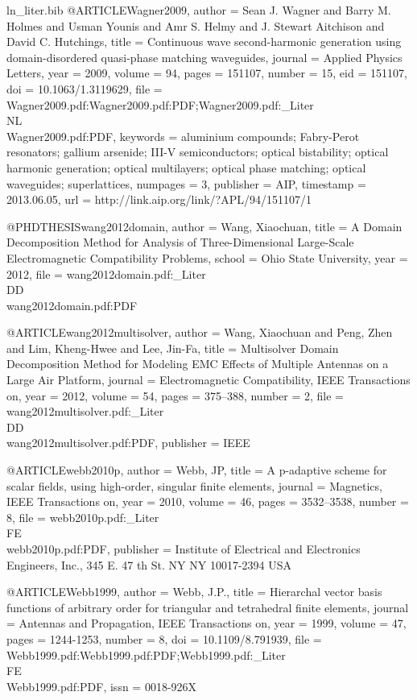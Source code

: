 \begin{filecontents*}{ln_liter.bib}
@ARTICLE{Wagner2009,
  author = {Sean J. Wagner and Barry M. Holmes and Usman Younis and Amr S. Helmy
	and J. Stewart Aitchison and David C. Hutchings},
  title = {Continuous wave second-harmonic generation using domain-disordered
	quasi-phase matching waveguides},
  journal = {Applied Physics Letters},
  year = {2009},
  volume = {94},
  pages = {151107},
  number = {15},
  eid = {151107},
  doi = {10.1063/1.3119629},
  file = {Wagner2009.pdf:Wagner2009.pdf:PDF;Wagner2009.pdf:_Liter\\NL\\Wagner2009.pdf:PDF},
  keywords = {aluminium compounds; Fabry-Perot resonators; gallium arsenide; III-V
	semiconductors; optical bistability; optical harmonic generation;
	optical multilayers; optical phase matching; optical waveguides;
	superlattices},
  numpages = {3},
  publisher = {AIP},
  timestamp = {2013.06.05},
  url = {http://link.aip.org/link/?APL/94/151107/1}
}

@PHDTHESIS{wang2012domain,
  author = {Wang, Xiaochuan},
  title = {A Domain Decomposition Method for Analysis of Three-Dimensional Large-Scale
	Electromagnetic Compatibility Problems},
  school = {Ohio State University},
  year = {2012},
  file = {wang2012domain.pdf:_Liter\\DD\\wang2012domain.pdf:PDF}
}

@ARTICLE{wang2012multisolver,
  author = {Wang, Xiaochuan and Peng, Zhen and Lim, Kheng-Hwee and Lee, Jin-Fa},
  title = {Multisolver Domain Decomposition Method for Modeling EMC Effects
	of Multiple Antennas on a Large Air Platform},
  journal = {Electromagnetic Compatibility, IEEE Transactions on},
  year = {2012},
  volume = {54},
  pages = {375--388},
  number = {2},
  file = {wang2012multisolver.pdf:_Liter\\DD\\wang2012multisolver.pdf:PDF},
  publisher = {IEEE}
}

@ARTICLE{webb2010p,
  author = {Webb, JP},
  title = {A p-adaptive scheme for scalar fields, using high-order, singular
	finite elements},
  journal = {Magnetics, IEEE Transactions on},
  year = {2010},
  volume = {46},
  pages = {3532--3538},
  number = {8},
  file = {webb2010p.pdf:_Liter\\FE\\webb2010p.pdf:PDF},
  publisher = {Institute of Electrical and Electronics Engineers, Inc., 345 E. 47
	th St. NY NY 10017-2394 USA}
}

@ARTICLE{Webb1999,
  author = {Webb, J.P.},
  title = {Hierarchal vector basis functions of arbitrary order for triangular
	and tetrahedral finite elements},
  journal = {Antennas and Propagation, IEEE Transactions on},
  year = {1999},
  volume = {47},
  pages = {1244-1253},
  number = {8},
  doi = {10.1109/8.791939},
  file = {Webb1999.pdf:Webb1999.pdf:PDF;Webb1999.pdf:_Liter\\FE\\Webb1999.pdf:PDF},
  issn = {0018-926X}
}


\end{filecontents*}
